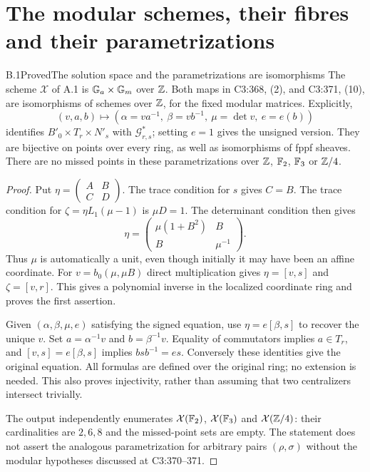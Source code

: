 \section{The modular schemes, their fibres and their parametrizations}

\begin{statement}{B.1}{Proved}{The solution space and the parametrizations are isomorphisms}
The scheme $\mathcal X$ of A.1 is $\mathbb G_a\times\mathbb G_m$ over $\mathbb Z$.
Both maps in C3:368, (2), and C3:371, (10), are isomorphisms of
schemes over $\mathbb Z$, for the fixed modular matrices. Explicitly,
\[
 (v,a,b)\longmapsto
 (\alpha=va^{-1},\ \beta=vb^{-1},\ \mu=\det v,\ e=e(b))
\]
identifies $B'_0\times T_r\times N'_s$ with $\mathcal G^*_{r,s}$;
setting $e=1$ gives the unsigned version. They are bijective on
points over every ring, as well as isomorphisms of fppf sheaves.
There are no missed points in these parametrizations over $\mathbb Z$,
$\mathbb F_2$, $\mathbb F_3$ or $\mathbb Z/4$.
\end{statement}
\begin{proof}
Put $\eta=\left(\begin{smallmatrix}A&B\\C&D\end{smallmatrix}\right)$.
The trace condition for $s$ gives $C=B$. The trace condition for
$\zeta=\eta L_1(\mu-1)$ is $\mu D=1$. The determinant condition
then gives
\[
 \eta=\begin{pmatrix}\mu(1+B^2)&B\\B&\mu^{-1}\end{pmatrix}.
\]
Thus $\mu$ is automatically a unit, even though initially it may
have been an affine coordinate. For
$v=b_0(\mu,\mu B)$ direct multiplication gives
$\eta=[v,s]$ and $\zeta=[v,r]$. This gives a polynomial inverse
in the localized coordinate ring and proves the first assertion.

Given $(\alpha,\beta,\mu,e)$ satisfying the signed equation, use
$\eta=e[\beta,s]$ to recover the unique $v$. Set
$a=\alpha^{-1}v$ and $b=\beta^{-1}v$. Equality of commutators
implies $a\in T_r$, and $[v,s]=e[\beta,s]$ implies
$b s b^{-1}=e s$. Conversely these identities give the original
equation. All formulas are defined over the original ring; no
extension is needed. This also proves injectivity, rather than
assuming that two centralizers intersect trivially.

The output independently enumerates $\mathcal X(\mathbb F_2)$,
$\mathcal X(\mathbb F_3)$ and $\mathcal X(\mathbb Z/4)$: their cardinalities
are $2,6,8$ and the missed-point sets are empty.
The statement does not assert the analogous parametrization for
arbitrary pairs $(\rho,\sigma)$ without the modular hypotheses
discussed at C3:370--371.
\end{proof}

